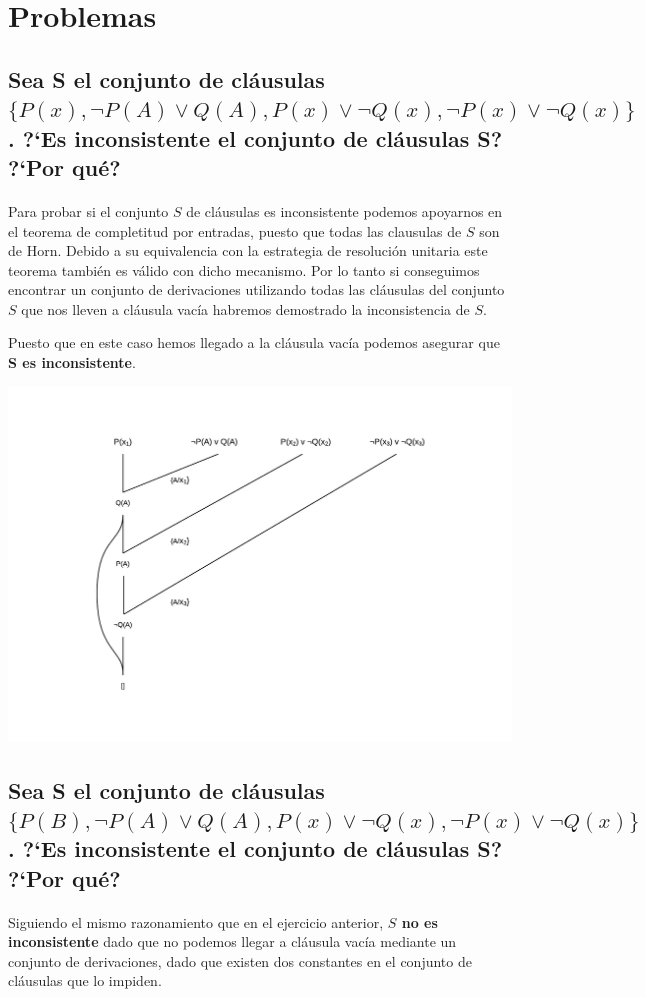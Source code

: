 \documentclass[10pt, a4paper,spanish]{article}
\begin{document}
	\newpage
	\section{Problemas}

		\subsection{Sea S el conjunto de cláusulas $ \{ P(x), \lnot P(A) \lor Q(A), P(x) \lor \lnot Q(x), \lnot P(x) \lor \lnot Q(x) \} $. ?`Es inconsistente el conjunto de cláusulas S? ?`Por qué?}

			\paragraph{}
			Para probar si el conjunto $S$ de cláusulas es inconsistente podemos apoyarnos en el teorema de completitud por entradas, puesto que todas las clausulas de $S$ son de Horn. Debido a su equivalencia con la estrategia de resolución unitaria este teorema también es válido con dicho mecanismo. Por lo tanto si conseguimos encontrar un conjunto de derivaciones utilizando todas las cláusulas del conjunto $S$ que nos lleven a cláusula vacía habremos demostrado la inconsistencia de $S$.

			Puesto que en este caso hemos llegado a la cláusula vacía podemos asegurar que \textbf{S es inconsistente}.

			\includegraphics[width=\textwidth]{problem-1-resolution}


		\subsection{Sea S el conjunto de cláusulas $ \{ P(B), \lnot P(A) \lor Q(A), P(x) \lor \lnot Q(x), \lnot P(x) \lor \lnot Q(x) \} $. ?`Es inconsistente el conjunto de cláusulas S? ?`Por qué?}

			\paragraph{}
			Siguiendo el mismo razonamiento que en el ejercicio anterior, \textbf{$S$ no es inconsistente} dado que no podemos llegar a cláusula vacía mediante un conjunto de derivaciones, dado que existen dos constantes en el conjunto de cláusulas que lo impiden.
\end{document}
